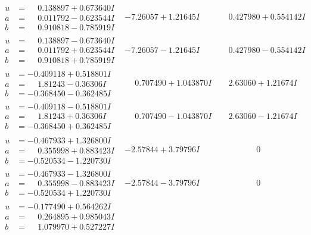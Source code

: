 \documentclass[1p]{elsarticle_modified}
\theoremstyle{definition}
\begin{document}
$$\begin{array}{c|c|c}
\begin{aligned}
u &= \phantom{-}0.138897 + 0.673640 I \\
a &= \phantom{-}0.011792 - 0.623544 I \\
b &= \phantom{-}0.910818 - 0.785919 I\end{aligned}
 & -7.26057 + 1.21645 I & \phantom{-}0.427980 + 0.554142 I \\ \hline\begin{aligned}
u &= \phantom{-}0.138897 - 0.673640 I \\
a &= \phantom{-}0.011792 + 0.623544 I \\
b &= \phantom{-}0.910818 + 0.785919 I\end{aligned}
 & -7.26057 - 1.21645 I & \phantom{-}0.427980 - 0.554142 I \\ \hline\begin{aligned}
u &= -0.409118 + 0.518801 I \\
a &= \phantom{-}1.81243 - 0.36306 I \\
b &= -0.368450 - 0.362485 I\end{aligned}
 & \phantom{-}0.707490 + 1.043870 I & \phantom{-}2.63060 + 1.21674 I \\ \hline\begin{aligned}
u &= -0.409118 - 0.518801 I \\
a &= \phantom{-}1.81243 + 0.36306 I \\
b &= -0.368450 + 0.362485 I\end{aligned}
 & \phantom{-}0.707490 - 1.043870 I & \phantom{-}2.63060 - 1.21674 I \\ \hline\begin{aligned}
u &= -0.467933 + 1.326800 I \\
a &= \phantom{-}0.355998 + 0.883423 I \\
b &= -0.520534 - 1.220730 I\end{aligned}
 & -2.57844 + 3.79796 I & \phantom{-0.000000 } 0 \\ \hline\begin{aligned}
u &= -0.467933 - 1.326800 I \\
a &= \phantom{-}0.355998 - 0.883423 I \\
b &= -0.520534 + 1.220730 I\end{aligned}
 & -2.57844 - 3.79796 I & \phantom{-0.000000 } 0 \\ \hline\begin{aligned}
u &= -0.177490 + 0.564262 I \\
a &= \phantom{-}0.264895 + 0.985043 I \\
b &= \phantom{-}1.079970 + 0.527227 I\end{aligned}

\end{array}$$
\end{document}
